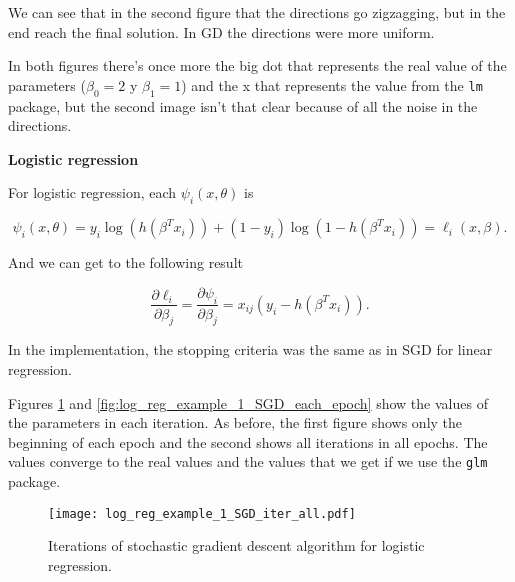 We can see that in the second figure that the directions go zigzagging, but in the end reach the final solution. In GD the directions were more uniform.

In both figures there's once more the big dot that represents the real value of the parameters ($\beta_0=2$ y $\beta_1 = 1$) and the x that represents the value from the \texttt{lm} package, but the second image isn't that clear because of all the noise in the directions.

\textbf{Logistic regression}

For logistic regression, each $\psi_i(x, \theta)$ is

$$
\psi_i(x, \theta) = y_i \log(h(\beta^T x_i)) + (1-y_i) \log(1-h(\beta^T x_i)) = \ell_i(x, \beta).
$$ 

And we can get to the following result

\[
\frac{\partial \ell_i}{\partial \beta_j} = \frac{\partial \psi_i}{\partial \beta_j} = x_{ij}(y_i - h(\beta^T x_i)).
\]

In the implementation, the stopping criteria was the same as in SGD for linear regression.

Figures \ref{fig:log_reg_example_1_SGD_iter_all} and \ref{fig:log_reg_example_1_SGD_each_epoch} show the values of the parameters in each iteration. As before, the first figure shows only the beginning of each epoch and the second shows all iterations in all epochs. The values converge to the real values and the values that we get if we use the \texttt{glm} package.





\begin{figure}[H]
  \centering
  \texttt{[image: log\_reg\_example\_1\_SGD\_iter\_all.pdf]}
  \caption{Iterations of stochastic gradient descent algorithm for logistic regression.}
  \label{fig:log_reg_example_1_SGD_iter_all}
\end{figure}
